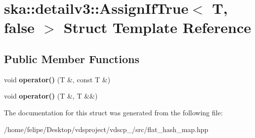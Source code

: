 \section{ska\+:\+:detailv3\+:\+:Assign\+If\+True$<$ T, false $>$ Struct Template Reference}
\label{structska_1_1detailv3_1_1AssignIfTrue_3_01T_00_01false_01_4}
\subsection*{Public Member Functions}
\begin{DoxyCompactItemize}
\item 
void {\bfseries operator()} (T \&, const T \&)\label{structska_1_1detailv3_1_1AssignIfTrue_3_01T_00_01false_01_4_af0d1960dd5d835fbc12229801c53e379}

\item 
void {\bfseries operator()} (T \&, T \&\&)\label{structska_1_1detailv3_1_1AssignIfTrue_3_01T_00_01false_01_4_a19dfedf7fc5084be5ab70f55bf317776}

\end{DoxyCompactItemize}


The documentation for this struct was generated from the following file\+:\begin{DoxyCompactItemize}
\item 
/home/felipe/\+Desktop/vdsproject/vdscp\+\_/src/flat\+\_\+hash\+\_\+map.\+hpp\end{DoxyCompactItemize}

